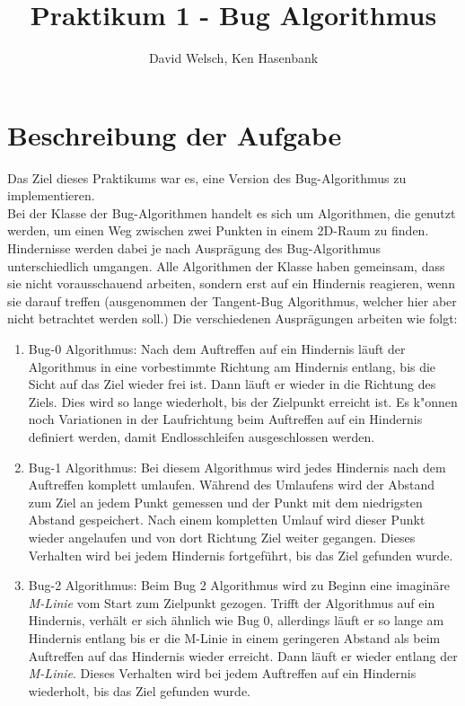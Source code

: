 \documentclass[a4paper]{scrartcl}
\begin{document}
\titlehead{Wintersemester 2017/2018\\Motion Planning\\Prof. Horsch, Rudi Scheitler}
\author{David Welsch, Ken Hasenbank}
\title{Praktikum 1 - Bug Algorithmus}
\maketitle

\section*{Beschreibung der Aufgabe}

Das Ziel dieses Praktikums war es, eine Version des Bug-Algorithmus zu implementieren. \\
Bei der Klasse der Bug-Algorithmen handelt es sich um Algorithmen, die genutzt werden, um einen Weg zwischen zwei Punkten in einem 2D-Raum zu finden. Hindernisse werden dabei je nach Ausprägung des Bug-Algorithmus unterschiedlich umgangen. Alle Algorithmen der Klasse haben gemeinsam, dass sie nicht vorausschauend arbeiten, sondern erst auf ein Hindernis reagieren, wenn sie darauf treffen (ausgenommen der Tangent-Bug Algorithmus, welcher hier aber nicht betrachtet werden soll.) Die verschiedenen Ausprägungen arbeiten wie folgt:\\

\begin{enumerate}
\item Bug-0 Algorithmus: Nach dem Auftreffen auf ein Hindernis läuft der Algorithmus in eine vorbestimmte Richtung am Hindernis entlang, bis die Sicht auf das Ziel wieder frei ist. Dann läuft er wieder in die Richtung des Ziels. Dies wird so lange wiederholt, bis der Zielpunkt erreicht ist. Es k"onnen noch Variationen in der Laufrichtung beim Auftreffen auf ein Hindernis definiert werden, damit Endlosschleifen ausgeschlossen werden.

\item Bug-1 Algorithmus: Bei diesem Algorithmus wird jedes Hindernis nach dem Auftreffen komplett umlaufen. Während des Umlaufens wird der Abstand zum Ziel an jedem Punkt gemessen und der Punkt mit dem niedrigsten Abstand gespeichert. Nach einem kompletten Umlauf wird dieser Punkt wieder angelaufen und von dort Richtung Ziel weiter gegangen. Dieses Verhalten wird bei jedem Hindernis fortgeführt, bis das Ziel gefunden wurde.

\item Bug-2 Algorithmus: Beim Bug 2 Algorithmus wird zu Beginn eine imaginäre \textit{M-Linie} vom Start zum Zielpunkt gezogen. Trifft der Algorithmus auf ein Hindernis, verhält er sich ähnlich wie Bug 0, allerdings läuft er so lange am Hindernis entlang bis er die M-Linie in einem geringeren Abstand als beim Auftreffen auf das Hindernis wieder erreicht. Dann läuft er wieder entlang der \textit{M-Linie}. Dieses Verhalten wird bei jedem Auftreffen auf ein Hindernis wiederholt, bis das Ziel gefunden wurde.
\end{enumerate}
\end{document}
